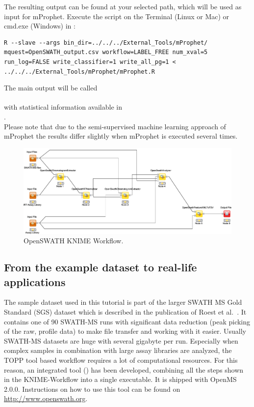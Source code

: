 The resulting output can be found at your selected path, which will be used as input for mProphet. Execute the script on the Terminal (Linux or Mac) or cmd.exe (Windows) in :

\begin{lstlisting}
R --slave --args bin_dir=../../../External_Tools/mProphet/ mquest=OpenSWATH_output.csv workflow=LABEL_FREE num_xval=5 run_log=FALSE write_classifier=1 write_all_pg=1 < ../../../External_Tools/mProphet/mProphet.R
\end{lstlisting}

The main output will be called\\
\\
with statistical information available in\\
.\\

Please note that due to the semi-supervised machine learning approach of mProphet the results differ slightly when mProphet is executed several times.

\begin{figure}[htbp]
  \includegraphics[width=\textwidth]{graphics/OpenSwath}
  \caption{OpenSWATH KNIME Workflow.}
  \label{fig:openswath}
\end{figure}

\subsection{From the example dataset to real-life applications}
The sample dataset used in this tutorial is part of the larger SWATH MS Gold Standard (SGS) dataset which is described in the publication of Roest et al.~\cite{Rost2014fd}.
It contains one of 90 SWATH-MS runs with significant data reduction (peak picking of the raw, profile data) to make file transfer and working with it easier. Usually SWATH-MS datasets are huge with several gigabyte per run. Especially when complex samples in combination with large assay libraries are analyzed, the TOPP tool based workflow requires a lot of computational resources. For this reason, an integrated tool () has been developed, combining all the steps shown in the KNIME-Workflow into a single executable. It is shipped with OpenMS 2.0.0. Instructions on how to use this tool can be found on \url{http://www.openswath.org}.

